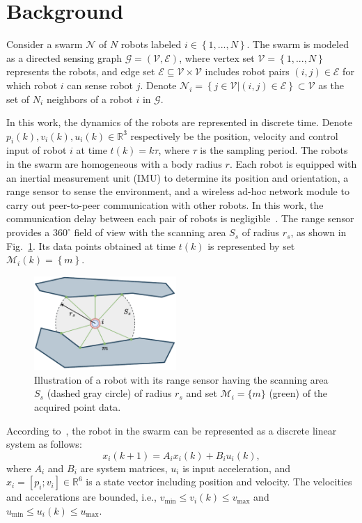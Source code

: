 \section{Background}\label{sec:problem}
Consider a swarm $\mathcal{N}$ of $N$ robots labeled $i\in\left\{1,...,N\right\}$. The swarm is modeled as a directed sensing graph $\mathcal{G}=\left(\mathcal{V},\mathcal{E}\right)$, where vertex set $\mathcal{V} = \left\{1,..., N\right\}$ represents the robots, and edge set $\mathcal{E}\subseteq\mathcal{V}\times \mathcal{V}$ includes robot pairs $\left(i, j\right)\in\mathcal{E}$ for which robot $i$ can sense robot $j$. Denote $\mathcal{N}_i=\left\{j\in\mathcal{V}|\left(i,j\right)\in\mathcal{E}\right\}\subset\mathcal{V}$ as the set of $N_i$ neighbors of a robot $i$ in $\mathcal{G}$.

In this work, the dynamics of the robots are represented in discrete time. Denote $p_i(k),v_i(k),u_i(k)\in\mathbb{R}^3$ respectively be the position, velocity and control input of robot $i$ at time $t(k) = k\tau$, where $\tau$ is the sampling period. The robots in the swarm are homogeneous with a body radius $r$. Each robot is equipped with an inertial measurement unit (IMU) to determine its position and orientation, a range sensor to sense the environment, and a wireless ad-hoc network module to carry out peer-to-peer communication with other robots. In this work, the communication delay between each pair of robots is negligible~\cite{AlonsoMora2018,9527169}. The range sensor provides a $360^\circ$ field of view with the scanning area $S_s$ of radius $r_s$, as shown in Fig.~\ref{fig:model}. Its data points obtained at time $t(k)$ is represented by set $\mathcal{M}_i(k)=\left\{m\right\}$.
\begin{figure}
    \centering
    \includegraphics[width=0.48\textwidth]{paper3/images/model.pdf}
    \caption{Illustration of a robot with its range sensor having the scanning area $S_s$ (dashed gray circle) of radius $r_s$ and set $\mathcal{M}_i=\{m\}$ (green) of the acquired point data.}
    \label{fig:model}
\end{figure}

According to~\cite{Soria2021}, the robot in the swarm can be represented as a discrete linear system as follows:
\begin{equation}
    x_i(k+1)=A_ix_i(k) + B_iu_i(k),
\end{equation}
where $A_i$ and $B_i$ are system matrices, $u_i$ is input acceleration, and $x_i=\left[p_i;v_i\right]\in\mathbb{R}^6$ is a state vector including position and velocity. The velocities and accelerations are bounded, i.e., $v_\text{min}\leq v_i(k)\leq v_\text{max}$ and $u_\text{min}\leq u_i(k)\leq u_\text{max}$.